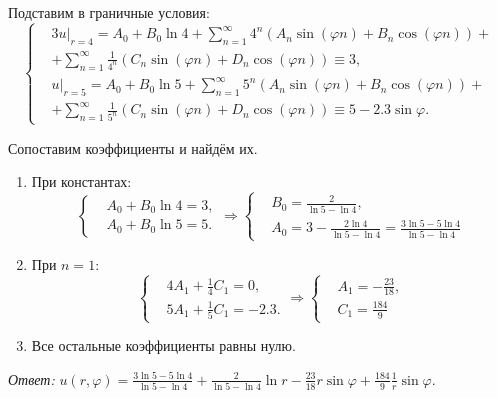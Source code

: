 Подставим в граничные условия:
\[
    \left\{\begin{split}
        & 3 u|_{r=4} = A_0 + B_0 \ln 4 + \sum_{n=1}^{\infty} 4^n \left( A_n \sin (\varphi n) + B_n \cos (\varphi n) \right) + \\
        & + \sum_{n=1}^{\infty} \frac{1}{4^n} \left( C_n \sin (\varphi n) + D_n \cos (\varphi n) \right) \equiv 3, \\[10pt]
        & u|_{r=5} = A_0 + B_0 \ln 5 + \sum_{n=1}^{\infty} 5^n \left( A_n \sin (\varphi n) + B_n \cos (\varphi n) \right) + \\
        & + \sum_{n=1}^{\infty} \frac{1}{5^n} \left( C_n \sin (\varphi n) + D_n \cos (\varphi n) \right) \equiv 5 - 2.3 \sin \varphi.
    \end{split}\right.
\]

Сопоставим коэффициенты и найдём их.
\begin{enumerate}
    \item При константах:
        \[
            \left\{ \begin{split}
                & A_0 + B_0 \ln4 = 3, \\
                & A_0 + B_0 \ln5 = 5.
            \end{split}\right.
            \Rightarrow
            \left\{ \begin{split}
                & B_0 = \frac{2}{\ln5 - \ln 4}, \\
                & A_0 = 3 - \frac{2 \ln 4}{\ln 5 - \ln 4} = \frac{3 \ln5 - 5 \ln 4}{\ln5 - \ln4}
            \end{split}\right.
        \]
    \item При \( n = 1 \):
        \[
            \left\{ \begin{split}
                & 4 A_1 + \frac{1}{4} C_1 = 0, \\
                & 5 A_1 + \frac{1}{5} C_1 = -2.3.
            \end{split}\right.
            \Rightarrow
            \left\{ \begin{split}
                & A_1 = -\frac{23}{18}, \\
                & C_1 = \frac{184}{9}
            \end{split}\right.
        \]
    \item Все остальные коэффициенты равны нулю.
\end{enumerate}

\textit{Ответ:} \( u(r, \varphi) = \frac{3 \ln5 - 5 \ln 4}{\ln5 - \ln4} + \frac{2}{\ln5 - \ln 4} \ln r -\frac{23}{18} r \sin \varphi + \frac{184}{9} \frac{1}{r} \sin \varphi \).

